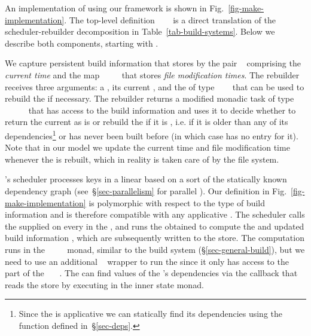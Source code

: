 An implementation of \Make using our framework is shown in
Fig.~\ref{fig-make-implementation}. The top-level definition
~\hs{=}~~ is a direct translation
of the scheduler-rebuilder decomposition in Table~\ref{tab-build-systems}. Below
we describe both components, starting with .

We capture persistent build information that \Make stores by the pair
~ comprising the \emph{current time}  and the
map ~\hs{::}~~~ that stores \emph{file
modification times}. The rebuilder receives three arguments: a , its
current , and the  of type
~~~ that can be used to rebuild the
 if necessary. The rebuilder returns a modified monadic task of type
~~~~~ that has
access to the build information and uses it to decide whether to return the
current  as is or rebuild the  if it is , i.e.
if it is older than any of its dependencies\footnote{Since the  is
applicative we can statically find its dependencies using the function
 defined in~\S\ref{sec-deps}.} or has never been built before
(in which case  has no entry for it). Note that in our model we
update the current time and file modification time whenever the  is
rebuilt, which in reality is taken care of by the file system.

\Make's scheduler processes keys in a linear  based on a
 sort of the statically known dependency graph
(see~\S\ref{sec-parallelism} for parallel \Make). Our definition in
Fig.~\ref{fig-make-implementation} is polymorphic with respect to the type of
build information  and is therefore compatible with any applicative
. The scheduler calls the supplied  on every
 in the , and runs the obtained  to compute the
 and updated build information , which are subsequently
written to the store. The computation runs in the
~~~~ monad, similar to the 
build system (\S\ref{sec-general-build}), but we need to use an additional
~ wrapper to run the  since it only has access to
the  part of the ~~~. The  can
find values of the 's dependencies via the  callback that
reads the store by executing  in the inner state monad.

